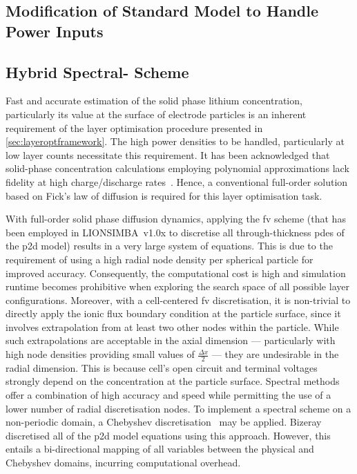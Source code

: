 \subsection{Modification of Standard  Model to Handle Power Inputs}\label{sec:innatepowerinput}


\subsection{Hybrid Spectral- Scheme}\label{sec:hybridfv-spectral}

Fast  and  accurate  estimation  of   the  solid  phase  lithium  concentration,
particularly  its   value  at   the  surface  of   electrode  particles   is  an
inherent  requirement   of  the   layer  optimisation  procedure   presented  in
\cref{sec:layeroptframework}.   The  high   power  densities   to  be   handled,
particularly  at  low   layer  counts  necessitate  this   requirement.  It  has
been   acknowledged  that   solid-phase  concentration   calculations  employing
polynomial    approximations   lack    fidelity    at   high    charge/discharge
rates~\cite{Santhanagopalan2006}.  Hence,  a  conventional  full-order  solution
based on Fick's law of diffusion is required for this layer optimisation task.

With full-order  solid phase  diffusion dynamics,  applying the  \gls{fv} scheme
(that has been  employed in LIONSIMBA~v1.0x to  discretise all through-thickness
\gls{pde}s of the \gls{p2d} model) results  in a very large system of equations.
This is due to the requirement of using a high radial node density per spherical
particle for improved accuracy. Consequently, the computational cost is high and
simulation  runtime  becomes prohibitive  when  exploring  the search  space  of
all  possible  layer configurations.  Moreover,  with  a cell-centered  \gls{fv}
discretisation,  it is  non-trivial to  directly apply  the ionic  flux boundary
condition at the particle surface, since it involves extrapolation from at least
two other nodes within the particle. While such extrapolations are acceptable in
the axial  dimension --- particularly  with high node densities  providing small
values of $\frac{\Delta x}{2}$ --- they are undesirable in the radial dimension.
This  is because  cell's  open  circuit and  terminal  voltages strongly  depend
on  the  concentration  at  the  particle  surface.  Spectral  methods  offer  a
combination  of high  accuracy and  speed while  permitting the  use of  a lower
number  of radial  discretisation nodes.  To implement  a spectral  scheme on  a
non-periodic  domain,  a  Chebyshev discretisation~\cite{Trefethen2000}  may  be
applied.  Bizeray~\etal{}~\cite{Bizeray2015} discretised  all  of the  \gls{p2d}
model  equations using  this approach.  However, this  entails a  bi-directional
mapping of all  variables between the physical and  Chebyshev domains, incurring
computational overhead.

